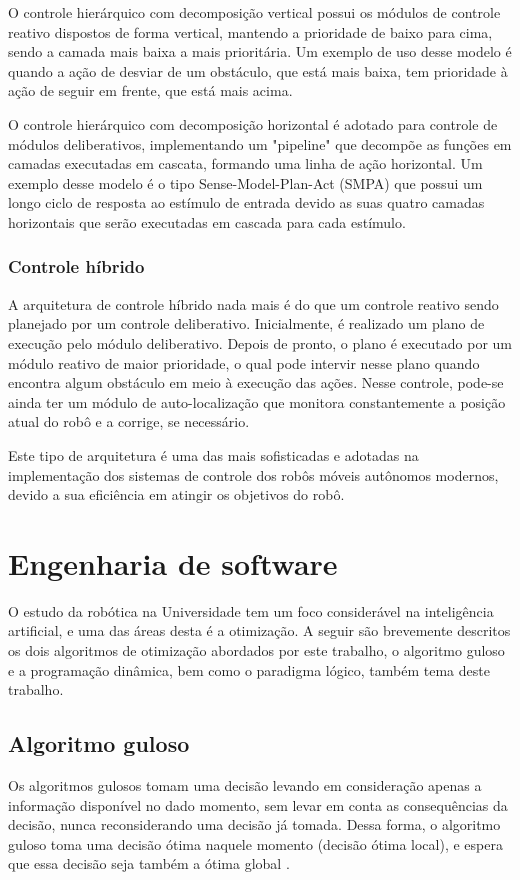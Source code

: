 O controle hierárquico com decomposição vertical possui os módulos de controle reativo dispostos de forma vertical, mantendo a prioridade de baixo para cima, sendo a camada mais baixa a mais prioritária. Um exemplo de uso desse modelo é quando a ação de desviar de um obstáculo, que está mais baixa, tem prioridade à ação de seguir em frente, que está mais acima.

O controle hierárquico com decomposição horizontal é adotado para controle de módulos deliberativos, implementando um "pipeline" que decompõe as funções em camadas executadas em cascata, formando uma linha de ação horizontal. Um exemplo desse modelo é o tipo Sense-Model-Plan-Act (SMPA) que possui um longo ciclo de resposta ao estímulo de entrada devido as suas quatro camadas horizontais que serão executadas em cascada para cada estímulo.

\subsubsection{Controle híbrido}
A arquitetura de controle híbrido nada mais é do que um controle reativo sendo planejado por um controle deliberativo. Inicialmente, é realizado um plano de execução pelo módulo deliberativo. Depois de pronto, o plano é executado por um módulo reativo de maior prioridade, o qual pode intervir nesse plano quando encontra algum obstáculo em meio à execução das ações. Nesse controle, pode-se ainda ter um módulo de auto-localização que monitora constantemente a posição atual do robô e a corrige, se necessário.

Este tipo de arquitetura é uma das mais sofisticadas e adotadas na implementação dos sistemas de controle dos robôs móveis autônomos modernos, devido a sua eficiência em atingir os objetivos do robô. 

\section{Engenharia de software}
O estudo da robótica na Universidade tem um foco considerável na inteligência artificial, e uma das áreas desta é a otimização. A seguir são brevemente descritos os dois algoritmos de otimização abordados por este trabalho, o algoritmo guloso e a programação dinâmica, bem como o paradigma lógico, também tema deste trabalho.
\subsection{Algoritmo guloso}
Os algoritmos gulosos tomam uma decisão levando em consideração apenas a informação disponível no dado momento, sem levar em conta as consequências da decisão, nunca reconsiderando uma decisão já tomada. Dessa forma, o algoritmo guloso toma uma decisão ótima naquele momento (decisão ótima local), e espera que essa decisão seja também a ótima global \cite{anderson2004}.
